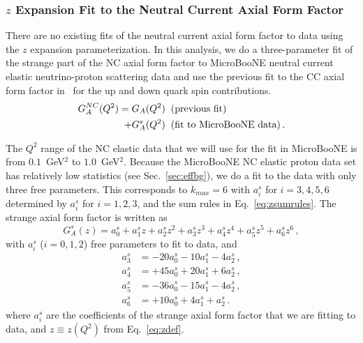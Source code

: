   \subsubsection{$z$ Expansion Fit to the Neutral Current Axial Form Factor}\label{sec:ncaxial}

  There are no existing fits of the neutral current axial form factor to data
  using the $z$ expansion parameterization. In this analysis, we do a
  three-parameter fit of the strange part of the NC axial form factor to
  MicroBooNE neutral current elastic neutrino-proton scattering data and use
  the previous fit to the CC axial form factor in~\cite{Meyer:2016oeg} for the
  up and down quark spin contributions.
  \begin{equation}
    \begin{aligned}
    G_A^{NC}(Q^2) = G_A(Q^2) \hspace{2mm} &(\textrm{previous fit}) \\
                + G_A^s(Q^2) \hspace{2mm} &(\textrm{fit to MicroBooNE data}) \,.
    \end{aligned}
  \end{equation}

  The $Q^2$ range of the NC elastic data that we will use for the fit in
  MicroBooNE is from $0.1$~GeV$^2$ to $1.0$~GeV$^2$.  Because the MicroBooNE NC
  elastic proton data set has relatively low statistics (see
  Sec.~\ref{sec:effbg}), we do a fit to the data with only three free
  parameters. This corresponds to $k_{max} = 6$ with $a_i^s$ for $i=3,4,5,6$
  determined by $a_i^s$ for $i=1,2,3$, and the sum rules in
  Eq.~\ref{eq:zsumrules}. The strange axial form factor is written as
  \begin{equation}
    G_A^s(z) = a_0^s + a_1^s z + a_2^s z^2 
      + a_3^s z^3 + a_4^s z^4 + a_5^s z^5 + a_6^s z^6 \,,
  \end{equation}
  with $a_i^s$ ($i=0,1,2$) free parameters to fit to data, and
  \begin{align}\label{eq:coefficients}
    a_3^s &= - 20 a_0^s - 10 a_1^s - 4 a_2^s \,,\\
    a_4^s &= + 45 a_0^s + 20 a_1^s + 6 a_2^s \,, \\
    a_5^s &= - 36 a_0^s - 15 a_1^s - 4 a_2^s \,, \\
    a_6^s &= + 10 a_0^s + 4 a_1^s + a_2^s \,.
  \end{align}
  where $a_i^s$ are the coefficients of the strange axial form factor that we
  are fitting to data, and $z \equiv z(Q^2)$ from Eq.~\ref{eq:zdef}.

